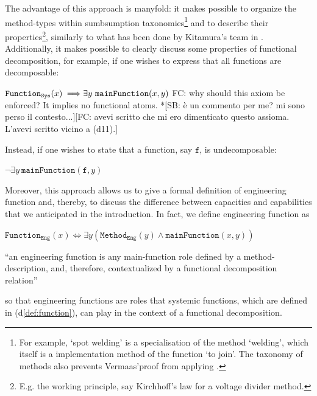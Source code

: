 \documentclass[sw]{iosart2x}
\newcommand{\bflist}{\begin{list}{}{\setlength{\topsep}{2mm}\setlength{\partopsep}{0mm}\setlength{\parsep}{0mm}\setlength{\leftmargin}{9mm}\setlength{\labelwidth}{8mm}}}
\newcommand{\eflist}{\end{list}}
\newcommand{\DefLabel}{\textrm{d}}
\newcommand{\ExLabel}{\textrm{ex}}
\newcounter{cntdef}
\newcommand{\mydf}[1]{\refstepcounter{cntdef}\begin{small}{\bf \DefLabel\thecntdef\label{def:#1}}\end{small}}
\newcommand{\myex}[1]{\refstepcounter{cntex}\begin{small}{\bf \ExLabel\thecntex\label{ex:#1}}\end{small}}
\newcounter{cntex}
\newcommand{\mytext}[1]{``#1''}
\newcommand{\refdf}[1]{({\DefLabel}\ref{#1})}
\newcommand{\generalStyle}[1]{\texttt{#1}}
\newcommand{\biRel}[3]{\generalStyle{#1}(#2,#3)}
\newcommand{\uniRelPar}[3]{\generalStyle{#1}_{\generalStyle{#3}}(#2)}
\newcommand{\cst}[1]{\ensuremath{\mathtt{#1}}}
\newcommand{\myiff}{\Longleftrightarrow}
\newcommand{\myfi}{\hspace{0.9mm} \Longrightarrow}
\newcommand{\Method}[1]{\uniRelPar{Method}{#1}{Eng}}
\newcommand{\FunctionSys}[1]{\uniRelPar{Function}{#1}{Sys}}
\newcommand{\FunctionEng}[1]{\uniRelPar{Function}{#1}{Eng}}
\newcommand{\mainFunction}[2]{\biRel{mainFunction}{#1}{#2}}
\newcommand{\TODO}[1]{{\color{red} #1}}
\begin{document}
The advantage of this approach is manyfold: it makes  possible to organize the method-types within sumbsumption taxonomies\footnote{For example, `spot welding' is a specialisation of the method `welding', which itself is a implementation method of the function `to join'. The taxonomy of methods also prevents Vermaas'proof from applying \cite{vermaasFormalImpossibilityAnalysing2013}.} and to describe their properties\footnote{E.g. the working principle, say Kirchhoff's law for a voltage divider method.}, similarly to what has been done by Kitamura's team in  \cite{kitamuraOntologybasedDescriptionFunctional2003}.
Additionally, it makes possible to clearly discuss some properties of functional decomposition, for example, if one wishes to express that all functions are decomposable:
\bflist
\item[\myex{noAtomsFunctions}] $\FunctionSys{x} \myfi \exists y~ \mainFunction{x}{y}$ \TODO{FC: why should this axiom be enforced? It implies no functional atoms. *[SB: è un commento per me? mi sono perso il contesto...][FC: avevi scritto che mi ero dimenticato questo assioma. L'avevi scritto vicino a (d11).]}
\eflist
Instead, if one wishes to state that a function, say $\cst{f}$, is undecomposable:
\bflist
\item[\myex{yesAtomsFunctions}] $\neg \exists y~\mainFunction{\cst{f}}{y}$
\eflist
Moreover, this approach allows us to give a formal definition of engineering function and, thereby, to discuss the difference between capacities and capabilities that we anticipated in the introduction. 
In fact, we define engineering function as
\bflist
  \item[\mydf{engfunction}]  $ \FunctionEng{x} \myiff \exists y (\Method{y} \land \mainFunction{x}{y}) $
  \item[] \mytext{an engineering function is any main-function role defined by a method-description, and, therefore, contextualized by a functional decomposition relation}
\eflist
so that engineering functions are roles that systemic functions, which are defined in \refdf{def:function}, can play in the context of a functional decomposition.
\end{document}
